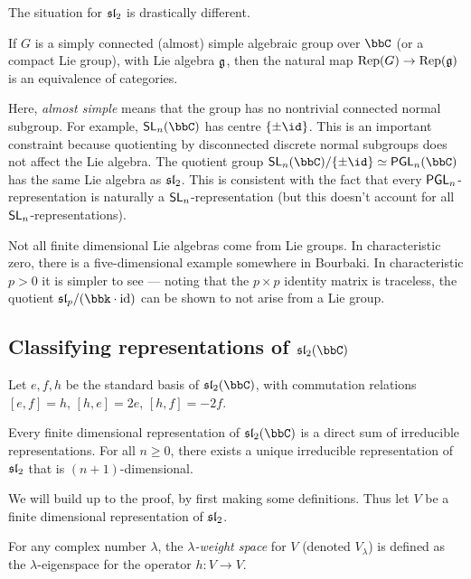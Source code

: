 The situation for $\sl_2$ is drastically different.

\begin{theorem}[(Lie)]
    If $G$ is a simply connected (almost) simple algebraic group over $\bbC$ (or
    a compact Lie group), with Lie algebra $\frakg$, then the natural map
    $\textnormal{Rep}(G)\to \textnormal{Rep}(\frakg)$ is an equivalence of categories.
\end{theorem}

Here, \emph{almost simple} means that the group has no nontrivial connected
normal subgroup. For example, $\sf{SL}_n(\bbC)$ has centre $\{\pm \id\}$. This
is an important constraint because quotienting by disconnected discrete normal
subgroups does not affect the Lie algebra. The quotient group
$\sf{SL}_n(\bbC)/\{\pm \id\}\simeq \mathsf{PGL}_n(\bbC)$ has the same Lie
algebra as $\sl_2$. This is consistent with the fact that every
$\sf{PGL}_n$-representation is naturally a $\sf{SL}_n$-representation (but this
doesn't account for all $\sf{SL}_n$-representations).

\begin{remark}
    Not all finite dimensional Lie algebras come from Lie groups. In
    characteristic zero, there is a five-dimensional example somewhere in
    Bourbaki. In characteristic $p>0$ it is simpler to see --- noting that the
    $p\times p$ identity matrix is traceless, the quotient $\sl_p/(\bbk\cdot
    \text{id})$ can be shown to not arise from a Lie group.
\end{remark}

\subsection{Classifying representations of $\sl_2(\bbC)$}
 
Let $e,f,h$ be the standard basis of $\sl_2(\bbC)$, with commutation relations
$[e,f]=h$, $[h,e]=2e$, $[h,f]=-2f$.

\begin{theorem}
    Every finite dimensional representation of $\sl_2(\bbC)$ is a direct sum of
    irreducible representations. For all $n\geq 0$, there exists a unique
    irreducible representation of $\sl_2$ that is $(n+1)$-dimensional.
\end{theorem}

We will build up to the proof, by first making some definitions. Thus let $V$ be a
finite dimensional representation of $\sl_2$.

\begin{definition}
    For any complex number $\lambda$, the \emph{$\lambda$-weight space} for $V$
    (denoted $V_\lambda$) is defined as the $\lambda$-eigenspace for the
    operator $h\colon V\to V$.
\end{definition}

